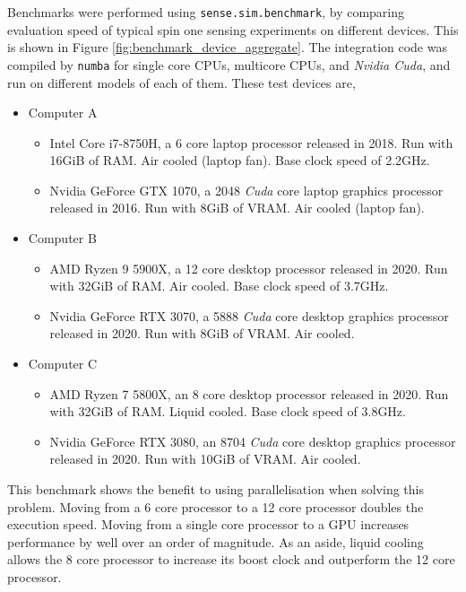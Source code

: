 \documentclass{jors}
\begin{document}
			Benchmarks were performed using \texttt{sense.sim.benchmark}, by comparing evaluation speed of typical spin one sensing experiments on different devices. This is shown in Figure \ref{fig:benchmark_device_aggregate}. The integration code was compiled by \texttt{numba} for single core CPUs, multicore CPUs, and \emph{Nvidia Cuda}, and run on different models of each of them. These test devices are,
			\begin{itemize}
				\item{
					Computer A\begin{itemize}
						\item Intel Core i7-8750H, a 6 core laptop processor released in 2018. Run with 16GiB of RAM. Air cooled (laptop fan). Base clock speed of 2.2GHz.
						\item Nvidia GeForce GTX 1070, a 2048 \emph{Cuda} core laptop graphics processor released in 2016. Run with 8GiB of VRAM. Air cooled (laptop fan).
					\end{itemize}
				}

				\item{Computer B\begin{itemize}
						\item AMD Ryzen 9 5900X, a 12 core desktop processor released in 2020. Run with 32GiB of RAM. Air cooled. Base clock speed of 3.7GHz.
						\item Nvidia GeForce RTX 3070, a 5888 \emph{Cuda} core desktop graphics processor released in 2020. Run with 8GiB of VRAM. Air cooled.
					\end{itemize}
				}

				\item{Computer C\begin{itemize}
						\item AMD Ryzen 7 5800X, an 8 core desktop processor released in 2020. Run with 32GiB of RAM. Liquid cooled. Base clock speed of 3.8GHz.
						\item Nvidia GeForce RTX 3080, an 8704 \emph{Cuda} core desktop graphics processor released in 2020. Run with 10GiB of VRAM. Air cooled.
					\end{itemize}
				}
			\end{itemize}

			This benchmark shows the benefit to using parallelisation when solving this problem. Moving from a 6 core processor to a 12 core processor doubles the execution speed. Moving from a single core processor to a GPU increases performance by well over an order of magnitude. As an aside, liquid cooling allows the 8 core processor to increase its boost clock and outperform the 12 core processor.
\end{document}
